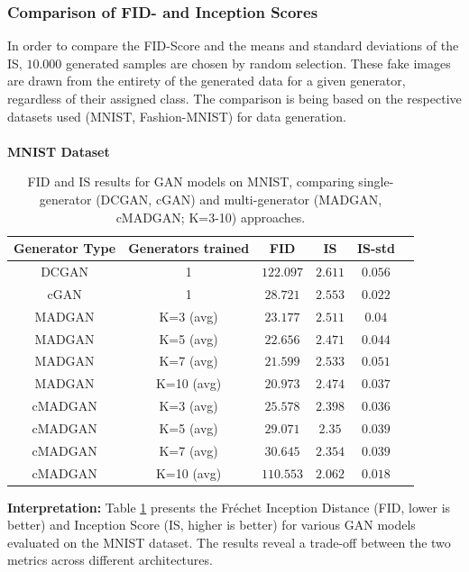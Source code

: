 \subsubsection[Question 1]{Comparison of FID- and Inception Scores}     \label{exp_results_ans_q1} 
In order to compare the FID-Score and the means and standard deviations of the IS, $10.000$ generated samples are chosen by random selection. These fake images are drawn from the entirety of the generated data for a given generator, regardless of their assigned class.
The comparison is being based on the respective datasets used (MNIST, Fashion-MNIST) for data generation.\\
\\
\noindent\textbf{MNIST Dataset}
\begin{table}[H]
    \centering
    \begin{tabular}{|c|c|c|c|c|c|}
        \hline
        Generator Type & Generators trained & FID & IS & IS-std \\
        \hline
        DCGAN & 1 & $122.097$ & $\mathbf{2.611}$ & $0.056$ \\
        \hline
        cGAN & 1 & $28.721$ & $2.553$ & $0.022$ \\
        \hline
        MADGAN & K=3 (avg) & $23.177$ & $2.511$ & $0.04$ \\
        \hline
        MADGAN & K=5 (avg) & $22.656$ & $2.471$ & $0.044$ \\
        \hline
        MADGAN & K=7 (avg) & $21.599$ & $2.533$ & $0.051$ \\
        \hline
        MADGAN & K=10 (avg) & $\mathbf{20.973}$ & $2.474$ & $0.037$ \\
        \hline
        cMADGAN & K=3 (avg) & $25.578$ & $2.398$ & $0.036$ \\
        \hline
        cMADGAN & K=5 (avg) & $29.071$ & $2.35$ & $0.039$ \\
        \hline
        cMADGAN & K=7 (avg) & $30.645$ & $2.354$ & $0.039$ \\
        \hline
        cMADGAN & K=10 (avg) & $110.553$ & $2.062$ & $0.018$ \\
        \hline
    \end{tabular}
    \caption{FID and IS results for GAN models on MNIST, comparing single-generator (DCGAN, cGAN) and multi-generator (MADGAN, cMADGAN; K=3-10) approaches.}
    \label{tab:exp_mnist_fid_is}
\end{table}
\textbf{Interpretation:} Table \ref{tab:exp_mnist_fid_is} presents the Fréchet Inception Distance (FID, lower is better) and Inception Score (IS, higher is better) for various GAN models evaluated on the MNIST dataset. The results reveal a trade-off between the two metrics across different architectures.

